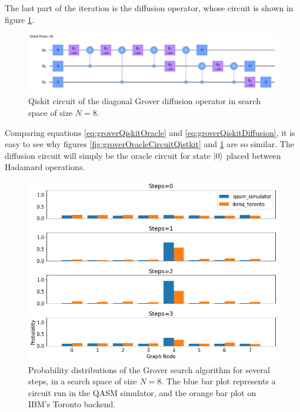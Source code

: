 \documentclass[../../dissertation.tex]{subfiles}
\begin{document}
The last part of the iteration is the diffusion operator, whose circuit is
shown in figure \ref{fig:groverDiffCircuitQistkit}.
\begin{figure}[!h]
	\centering
	\includegraphics[scale=0.25]{img/Qiskit/GroverQiskit/Circuits/GroverQiskitCircDiff_N3_M4_S3.png}
	\caption{Qiskit circuit of the  diagonal Grover diffusion operator in search space of size $N=8$.}
	\label{fig:groverDiffCircuitQistkit}
\end{figure}
Comparing equations \eqref{eq:groverQiskitOracle} and
\eqref{eq:groverQiskitDiffusion}, it is easy to see why figures
\ref{fig:groverOracleCircuitQistkit} and \ref{fig:groverDiffCircuitQistkit} are
so similar. The diffusion circuit will simply be the oracle circuit for state
$\ket{0}$ placed between Hadamard operations.
\begin{figure}[!h]
	\centering
	\includegraphics[scale=0.40]{img/Qiskit/GroverQiskit/GroverQiskitSearch_N3_M4_S0123}
	\caption{Probability distributions of the Grover search algorithm for several steps, in a search space of size $N=8$. The blue bar plot represents a circuit run in the QASM simulator, and the orange bar plot on IBM's Toronto backend.}
	\label{fig:groverQiskitDist}
\end{figure}\par
\end{document}
